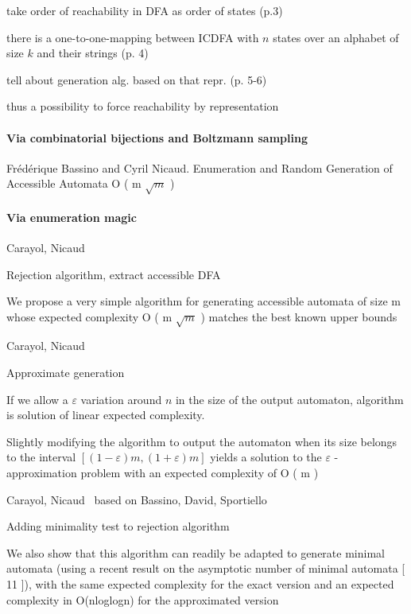 take order of reachability in DFA as order of states (p.3)

there is a one-to-one-mapping between ICDFA with $n$ states over an alphabet of size $k$ and their strings (p. 4)

tell about generation alg. based on that repr. (p. 5-6)

thus a possibility to force reachability by representation

\paragraph{Via combinatorial bijections and Boltzmann sampling}

Frédérique Bassino and Cyril Nicaud. Enumeration and Random Generation of Accessible
Automata  O ( m $\sqrt{m}$ )

\paragraph{Via enumeration magic}

Carayol, Nicaud~\cite[p. 9]{CN12}

Rejection algorithm, extract accessible DFA

We propose a very simple algorithm for generating accessible automata of size m whose
expected complexity O ( m $\sqrt{m}$ ) matches the best known upper bounds

Carayol, Nicaud~\cite[p. 9]{CN12}

Approximate generation

If we allow a $\varepsilon$ variation around $n$ in the size of the output automaton, algorithm is solution of linear expected complexity.

Slightly modifying the algorithm to output the automaton when its size belongs to the interval $[(1-\varepsilon ) m, (1+ \varepsilon ) m ]$ yields a solution to the $\varepsilon$ -approximation problem with an expected complexity of O ( m )

Carayol, Nicaud~\cite[p. 10]{CN12} based on Bassino, David, Sportiello~\cite{BDS11}

Adding minimality test to rejection algorithm

We also show that this algorithm can readily be adapted to generate
minimal automata (using a recent result on the asymptotic number of minimal automata
[ 11 ]), with the same expected complexity for the exact version and an expected complexity
in O(nloglogn) for the approximated version

